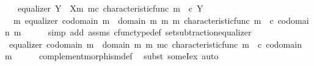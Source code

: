 \begin{isabellebody}
\ \ \ {\isachardoublequoteopen}equalizer\ {\isacharparenleft}{\kern0pt}Y\ {\isasymsetminus}\ {\isacharparenleft}{\kern0pt}X{\isacharcomma}{\kern0pt}m{\isacharparenright}{\kern0pt}{\isacharparenright}{\kern0pt}\ m\isactrlsup c\ {\isacharparenleft}{\kern0pt}characteristic{\isacharunderscore}{\kern0pt}func\ m{\isacharparenright}{\kern0pt}\ {\isacharparenleft}{\kern0pt}{\isasymf}\ {\isasymcirc}\isactrlsub c\ {\isasymbeta}\isactrlbsub Y\isactrlesub {\isacharparenright}{\kern0pt}{\isachardoublequoteclose}\isanewline
%
\isadelimproof
%
\endisadelimproof
%
\isatagproof
{}\isamarkupfalse%
\ {\isacharminus}{\kern0pt}\isanewline
\ \ \isamarkupfalse%
\ {\isachardoublequoteopen}{\isasymexists}\ m{\isacharprime}{\kern0pt}{\isachardot}{\kern0pt}\ equalizer\ {\isacharparenleft}{\kern0pt}codomain\ m\ {\isasymsetminus}\ {\isacharparenleft}{\kern0pt}domain\ m{\isacharcomma}{\kern0pt}\ m{\isacharparenright}{\kern0pt}{\isacharparenright}{\kern0pt}\ m{\isacharprime}{\kern0pt}\ {\isacharparenleft}{\kern0pt}characteristic{\isacharunderscore}{\kern0pt}func\ m{\isacharparenright}{\kern0pt}\ {\isacharparenleft}{\kern0pt}{\isasymf}\ {\isasymcirc}\isactrlsub c\ {\isasymbeta}\isactrlbsub codomain\ m\isactrlesub {\isacharparenright}{\kern0pt}{\isachardoublequoteclose}\isanewline
\ \ \ \ \isamarkupfalse%
\ {\isacharparenleft}{\kern0pt}simp\ add{\isacharcolon}{\kern0pt}\ assms\ cfunc{\isacharunderscore}{\kern0pt}type{\isacharunderscore}{\kern0pt}def\ set{\isacharunderscore}{\kern0pt}subtraction{\isacharunderscore}{\kern0pt}equalizer{\isacharparenright}{\kern0pt}\isanewline
\ \ \isamarkupfalse%
\ \isamarkupfalse%
\ {\isachardoublequoteopen}equalizer\ {\isacharparenleft}{\kern0pt}codomain\ m\ {\isasymsetminus}\ {\isacharparenleft}{\kern0pt}domain\ m{\isacharcomma}{\kern0pt}\ m{\isacharparenright}{\kern0pt}{\isacharparenright}{\kern0pt}\ m\isactrlsup c\ {\isacharparenleft}{\kern0pt}characteristic{\isacharunderscore}{\kern0pt}func\ m{\isacharparenright}{\kern0pt}\ {\isacharparenleft}{\kern0pt}{\isasymf}\ {\isasymcirc}\isactrlsub c\ {\isasymbeta}\isactrlbsub codomain\ m\isactrlesub {\isacharparenright}{\kern0pt}{\isachardoublequoteclose}\isanewline
\ \ \ \ \isamarkupfalse%
\ complement{\isacharunderscore}{\kern0pt}morphism{\isacharunderscore}{\kern0pt}def\ \isamarkupfalse%
\ {\isacharparenleft}{\kern0pt}subst\ someI{\isacharunderscore}{\kern0pt}ex{\isacharcomma}{\kern0pt}\ auto{\isacharparenright}{\kern0pt}\isanewline
\ \ \isamarkupfalse%
\ \isamarkupfalse%

\end{isabellebody}
